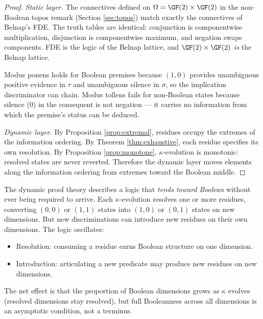 \begin{proof}
\emph{Static layer.}
The connectives defined on $\Omega = \GF(2) \times \GF(2)$
in the non-Boolean topos remark (Section \ref{sec:topos})
match exactly the connectives of Belnap's FDE. The truth
tables are identical:
conjunction is componentwise multiplication,
disjunction is componentwise maximum,
and negation swaps components. FDE is the logic of the
Belnap lattice, and $\GF(2) \times \GF(2)$ \emph{is} the
Belnap lattice.

Modus ponens holds for Boolean premises because $(1,0)$
provides unambiguous positive evidence in $\tau$ and
unambiguous silence in $\sigma$, so the implication
discriminator can chain. Modus tollens fails for
non-Boolean states because silence ($0$) in the consequent
is not negation --- it carries no information from which
the premise's status can be deduced.

\emph{Dynamic layer.}
By Proposition \ref{prop:extremal}, residues occupy the
extremes of the information ordering. By Theorem
\ref{thm:exhaustive}, each residue specifies its own
resolution. By Proposition \ref{prop:monotone},
$\kappa$-evolution is monotonic: resolved states are
never reverted. Therefore the dynamic layer moves
elements along the information ordering from extremes
toward the Boolean middle.
\end{proof}

\begin{remark}
The dynamic proof theory describes a logic that
\emph{tends toward Boolean} without ever being required
to arrive. Each $\kappa$-evolution resolves one or more
residues, converting $(0,0)$ or $(1,1)$ states into
$(1,0)$ or $(0,1)$ states on new dimensions. But new
discriminations can introduce new residues on their own
dimensions. The logic oscillates:
\begin{itemize}[nosep]
  \item Resolution: consuming a residue earns Boolean
    structure on one dimension.
  \item Introduction: articulating a new predicate may
    produce new residues on new dimensions.
\end{itemize}
The net effect is that the proportion of Boolean dimensions
grows as $\kappa$ evolves (resolved dimensions stay
resolved), but full Booleanness across all dimensions
is an asymptotic condition, not a terminus.
\end{remark}

